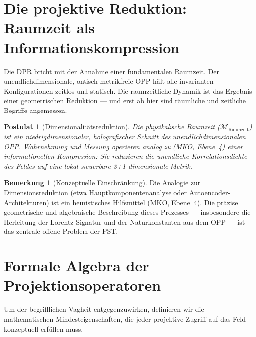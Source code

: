 \documentclass[11pt,a4paper]{article}
\theoremstyle{plain}
\newtheorem{postulate}{Postulat}[section]
\theoremstyle{definition}
\newtheorem{remark}{Bemerkung}[section]
\begin{document}
\section{Die projektive Reduktion: Raumzeit als Informationskompression}

Die DPR bricht mit der Annahme einer fundamentalen Raumzeit. Der unendlichdimensionale,
ontisch metrikfreie OPP h\"{a}lt alle invarianten Konfigurationen zeitlos und statisch.
Die raumzeitliche Dynamik ist das Ergebnis einer geometrischen Reduktion --- und erst
ab hier sind r\"{a}umliche und zeitliche Begriffe angemessen.

\begin{postulate}[Dimensionalit\"{a}tsreduktion]
Die physikalische Raumzeit ($\mathcal{M}_{\text{Raumzeit}}$) ist ein niedrigdimensionaler,
holografischer Schnitt des unendlichdimensionalen OPP. Wahrnehmung und Messung operieren
\emph{analog zu} (MKO, Ebene~4) einer informationellen Kompression: Sie reduzieren die
unendliche Korrelationsdichte des Feldes auf eine lokal steuerbare 3+1-dimensionale
Metrik.
\end{postulate}

\begin{remark}[Konzeptuelle Einschr\"{a}nkung]
Die Analogie zur Dimensionsreduktion (etwa Hauptkomponentenanalyse oder
Autoencoder-Architekturen) ist ein heuristisches Hilfsmittel (MKO, Ebene~4). Die
pr\"{a}zise geometrische und algebraische Beschreibung dieses Prozesses --- insbesondere
die Herleitung der Lorentz-Signatur und der Naturkonstanten aus dem OPP --- ist das
zentrale offene Problem der PST.
\end{remark}

\section{Formale Algebra der Projektionsoperatoren}

Um der begrifflichen Vagheit entgegenzuwirken, definieren wir die mathematischen
Mindesteigenschaften, die jeder projektive Zugriff auf das Feld konzeptuell erf\"{u}llen
muss.
\end{document}
